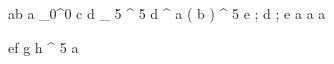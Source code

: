 \begin{eqcode}{a}{b}{}{}
  a \gets {}_0^0 \lend
  c \gets d _ 5 ^ 5 \lend
  d \gets \genar \limits ^ { a } ( b ) ^ 5 \lend
  e ; d ; e  \lend
  a \gets {} \lend
  a \gets {} \lend
  a \gets {} \lend
\end{eqcode}


\begin{eqcode}{e}{f}{}{}
  g \gets h ^ 5 \lend
  a  \lend
\end{eqcode}
